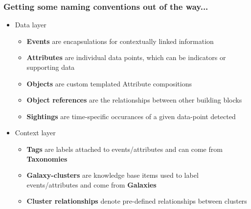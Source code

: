 \begin{frame}
        \frametitle{Getting some naming conventions out of the way...}
         \begin{itemize}
                \item Data layer
                \begin{itemize}
                    \item {\bf Events} are encapsulations for contextually linked information
                    \item {\bf Attributes} are individual data points, which can be indicators or supporting data
                    \item {\bf Objects} are custom templated Attribute compositions
                    \item {\bf Object references} are the relationships between other building blocks
                    \item {\bf Sightings} are time-specific occurances of a given data-point detected
                \end{itemize}
                \item Context layer
                \begin{itemize}
                    \item {\bf Tags} are labels attached to events/attributes and can come from {\bf Taxonomies}
                    \item {\bf Galaxy-clusters} are knowledge base items used to label events/attributes and come from {\bf Galaxies}
                    \item {\bf Cluster relationships} denote pre-defined relationships between clusters
                \end{itemize}
        \end{itemize}
\end{frame}

